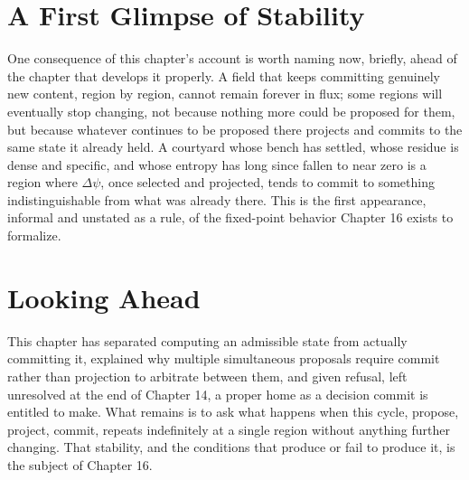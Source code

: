 \section{A First Glimpse of Stability}

One consequence of this chapter's account is worth naming now, briefly, ahead of the chapter that develops it properly. A field that keeps committing genuinely new content, region by region, cannot remain forever in flux; some regions will eventually stop changing, not because nothing more could be proposed for them, but because whatever continues to be proposed there projects and commits to the same state it already held. A courtyard whose bench has settled, whose residue is dense and specific, and whose entropy has long since fallen to near zero is a region where \(\Delta\psi\), once selected and projected, tends to commit to something indistinguishable from what was already there. This is the first appearance, informal and unstated as a rule, of the fixed-point behavior Chapter 16 exists to formalize.

\section{Looking Ahead}

This chapter has separated computing an admissible state from actually committing it, explained why multiple simultaneous proposals require commit rather than projection to arbitrate between them, and given refusal, left unresolved at the end of Chapter 14, a proper home as a decision commit is entitled to make. What remains is to ask what happens when this cycle, propose, project, commit, repeats indefinitely at a single region without anything further changing. That stability, and the conditions that produce or fail to produce it, is the subject of Chapter 16.
